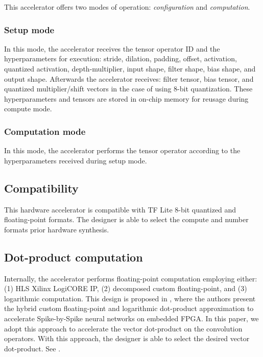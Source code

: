 This accelerator offers two modes of operation: \emph{configuration} and \emph{computation}.

\subsubsection{Setup mode}
In this mode, the accelerator receives the tensor operator ID and the hyperparameters for execution: stride, dilation, padding, offset, activation, quantized activation, depth-multiplier, input shape, filter shape, bias shape, and output shape. Afterwards the accelerator receives: filter tensor, bias tensor, and quantized multiplier/shift vectors in the case of using 8-bit quantization. These hyperparameters and tensors are stored in on-chip memory for reusage during compute mode.

\subsubsection{Computation mode}
In this mode, the accelerator performs the tensor operator according to the hyperparameters received during setup mode.

\subsection{Compatibility}

 This hardware accelerator is compatible with TF Lite 8-bit quantized and floating-point formats. The designer is able to select the compute and number formats prior hardware synthesis.
 
 \subsection{Dot-product computation}
Internally, the accelerator performs floating-point computation employing either: (1) HLS Xilinx LogiCORE IP, (2) decomposed custom floating-point, and (3) logarithmic computation. This design is proposed in \cite{nevarez2021accelerating}, where the authors present the hybrid custom floating-point and logarithmic dot-product approximation to accelerate Spike-by-Spike neural networks on embedded FPGA. In this paper, we adopt this approach to accelerate the vector dot-product on the convolution operators. With this approach, the designer is able to select the desired vector dot-product. See .

